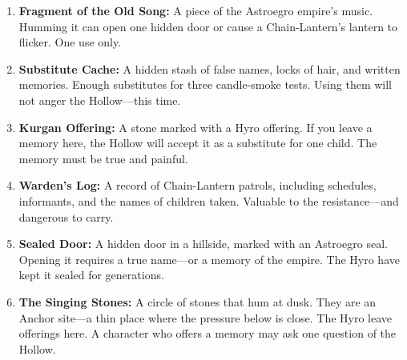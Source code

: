 \begin{enumerate}
\item \textbf{Fragment of the Old Song:} A piece of the Astroegro empire's music. Humming it can open one hidden door or cause a Chain-Lantern's lantern to flicker. One use only.
\item \textbf{Substitute Cache:} A hidden stash of false names, locks of hair, and written memories. Enough substitutes for three candle-smoke tests. Using them will not anger the Hollow---this time.
\item \textbf{Kurgan Offering:} A stone marked with a Hyro offering. If you leave a memory here, the Hollow will accept it as a substitute for one child. The memory must be true and painful.
\item \textbf{Warden's Log:} A record of Chain-Lantern patrols, including schedules, informants, and the names of children taken. Valuable to the resistance---and dangerous to carry.
\item \textbf{Sealed Door:} A hidden door in a hillside, marked with an Astroegro seal. Opening it requires a true name---or a memory of the empire. The Hyro have kept it sealed for generations.
\item \textbf{The Singing Stones:} A circle of stones that hum at dusk. They are an Anchor site---a thin place where the pressure below is close. The Hyro leave offerings here. A character who offers a memory may ask one question of the Hollow.
\end{enumerate}

